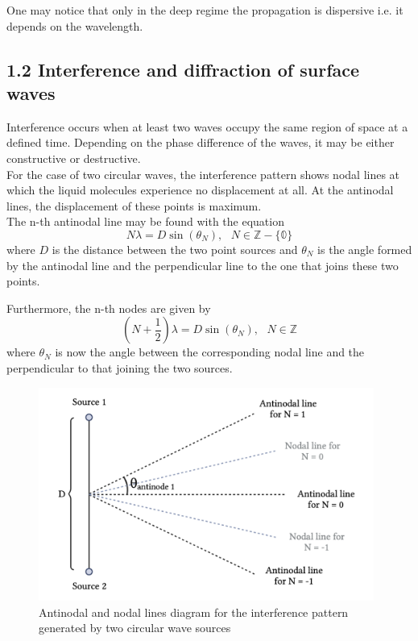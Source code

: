 \documentclass[a4paper, 12pt]{article}
\begin{document}
	One may notice that only in the deep regime the propagation is dispersive i.e. it depends on the wavelength.
	
	\subsection{1.2 Interference and diffraction of surface waves}
		Interference occurs when at least two waves occupy the same region of space at a defined time. Depending on the phase difference of the waves, it may be either constructive or destructive. \\
		
		For the case of two circular waves, the interference pattern shows nodal lines at which the liquid molecules experience no displacement at all. At the antinodal lines, the displacement of these points is maximum.\\
		
		The n-th antinodal line may be found with the equation
		\begin{equation}\label{antinodal}
			N\lambda = D\sin(\theta_N),\mbox{  } N \in \mathbb{Z - \{ \mbox{0} \}}
		\end{equation}
		where $D$ is the distance between the two point sources and $\theta_N$ is the angle formed by the antinodal line and the perpendicular line to the one that joins these two points. 
		 
		Furthermore, the n-th nodes are given by
		\begin{equation}\label{nodal}
			\left(N + \frac{1}{2}\right)\lambda = D \sin(\theta_N), \mbox{  } N \in \mathbb{Z}
		\end{equation}
		where $\theta_N$ is now the angle between the corresponding nodal line and the perpendicular to that joining the two sources. \\
		
		\begin{figure}[hbt!]
			\centering
			\includegraphics[height=7cm]{nodeantinodediagram}
			\caption{Antinodal and nodal lines diagram for the interference pattern generated by two circular wave sources}
		\end{figure}
		
\end{document}
